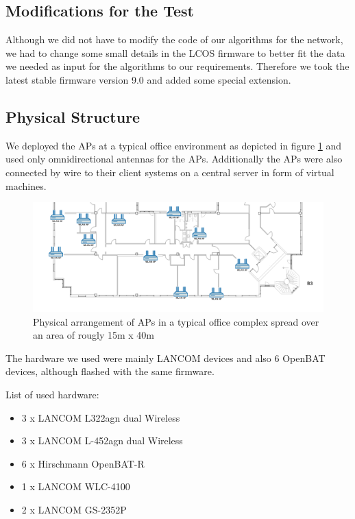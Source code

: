     \subsection{Modifications for the Test}
      Although we did not have to modify the code of our algorithms for the network, we had to change some small details in the LCOS firmware to better fit the 
      data we needed as input for the algorithms to our requirements. Therefore we took the latest stable firmware version 9.0 and added some special extension.
   
\newpage
   
    \subsection{Physical Structure}
      We deployed the APs at a typical office environment as depicted in figure \ref{fig:2ndfloor} and used only omnidirectional antennas for the APs.
      Additionally the APs were also connected by wire to their client systems on a central server in form of virtual machines.
      
      \begin{figure}[h!]
	\centering
	\includegraphics[width=\columnwidth]{figures/Lancom-flur-withaps}
	\caption{Physical arrangement of APs in a typical office complex spread over an area of rougly 15m x 40m}
	\label{fig:2ndfloor}
      \end{figure}
      
      The hardware we used were mainly LANCOM devices and also 6 OpenBAT devices, although flashed with the same firmware.
     
      List of used hardware:
      \begin{itemize}
	\item 3 x LANCOM L322agn dual Wireless \cite{lancom}
	\item 3 x LANCOM L-452agn dual Wireless
	\item 6 x Hirschmann OpenBAT-R
	\item 1 x LANCOM WLC-4100
	\item 2 x LANCOM GS-2352P
      \end{itemize}
      
